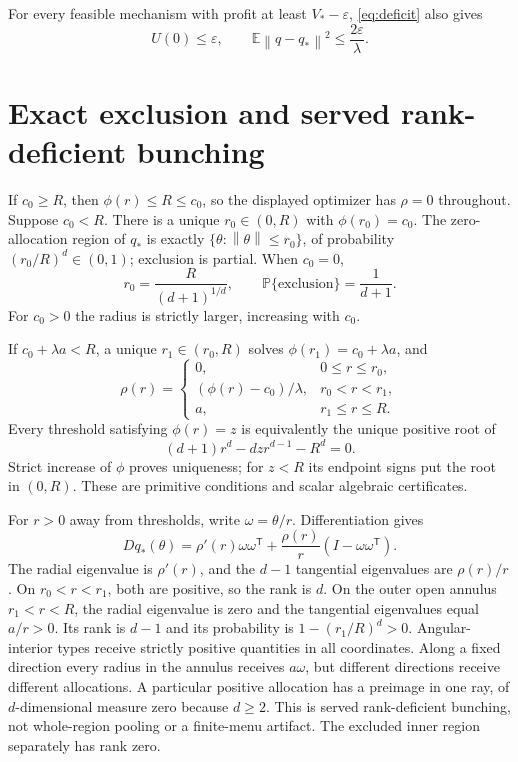 \documentclass[11pt,a4paper]{article}
\numberwithin{equation}{section}
\newcommand{\E}{\mathbb E}
\newcommand{\Prob}{\mathbb P}
\newcommand{\norm}[1]{\left\lVert #1\right\rVert}
\newcommand{\T}{\mathsf T}
\begin{document}
For every feasible mechanism with profit at least \(V_*-\varepsilon\),
\eqref{eq:deficit} also gives
\begin{equation}\label{eq:stability}
 U(0)\le\varepsilon,\qquad
 \E\norm{q-q_*}^2\le\frac{2\varepsilon}{\lambda}.
\end{equation}

\section{Exact exclusion and served rank-deficient bunching}\label{sec:geometry}
If \(c_0\ge R\), then \(\phi(r)\le R\le c_0\), so the displayed
optimizer has \(\rho=0\) throughout.
Suppose \(c_0<R\). There is a unique \(r_0\in(0,R)\) with
\(\phi(r_0)=c_0\). The zero-allocation region of \(q_*\) is exactly
\(\{\theta:\norm\theta\le r_0\}\), of probability
\((r_0/R)^d\in(0,1)\); exclusion is partial.
When \(c_0=0\),
\[
 r_0=\frac R{(d+1)^{1/d}},\qquad
 \Prob\{\text{exclusion}\}=\frac1{d+1}.
\]
For \(c_0>0\) the radius is strictly larger, increasing with \(c_0\).

If \(c_0+\lambda a<R\), a unique \(r_1\in(r_0,R)\) solves
\(\phi(r_1)=c_0+\lambda a\), and
\[
 \rho(r)=
 \begin{cases}
 0,&0\le r\le r_0,\\
 (\phi(r)-c_0)/\lambda,&r_0<r<r_1,\\
 a,&r_1\le r\le R.
 \end{cases}
\]
Every threshold satisfying \(\phi(r)=z\) is equivalently the unique
positive root of
\begin{equation}\label{eq:thresholdpoly}
 (d+1)r^d-dzr^{d-1}-R^d=0.
\end{equation}
Strict increase of \(\phi\) proves uniqueness; for \(z<R\) its
endpoint signs put the root in \((0,R)\).
These are primitive conditions and scalar algebraic certificates.

For \(r>0\) away from thresholds, write \(\omega=\theta/r\).
Differentiation gives
\begin{equation}\label{eq:rankmatrix}
 Dq_*(\theta)=\rho'(r)\omega\omega^\T
       +\frac{\rho(r)}r(I-\omega\omega^\T).
\end{equation}
The radial eigenvalue is \(\rho'(r)\), and the \(d-1\) tangential
eigenvalues are \(\rho(r)/r\).
On \(r_0<r<r_1\), both are positive, so the rank is \(d\).
On the outer open annulus \(r_1<r<R\), the radial eigenvalue is zero
and the tangential eigenvalues equal \(a/r>0\).
Its rank is \(d-1\) and its probability is \(1-(r_1/R)^d>0\).
Angular-interior types receive strictly positive quantities in all
coordinates. Along a fixed direction every radius in the annulus
receives \(a\omega\), but different directions receive different
allocations. A particular positive allocation has a preimage in one
ray, of \(d\)-dimensional measure zero because \(d\ge2\).
This is served rank-deficient bunching, not whole-region pooling or
a finite-menu artifact. The excluded inner region separately has rank zero.
\end{document}
